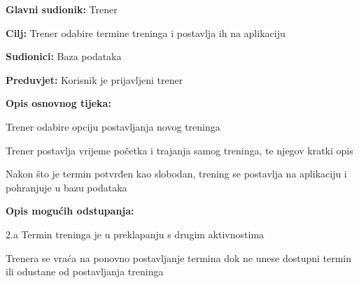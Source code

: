 \documentclass{article}
\begin{document}
		\begin{packed_item}
			
			\item \textbf{Glavni sudionik: }Trener
			\item  \textbf{Cilj:} Trener odabire termine treninga i postavlja ih na aplikaciju   
			\item  \textbf{Sudionici:} Baza podataka
			\item  \textbf{Preduvjet:} Korisnik je prijavljeni trener 
			\item  \textbf{Opis osnovnog tijeka:}
			
			\item[] \begin{packed_enum}
				\item Trener odabire opciju postavljanja novog treninga  
				\item Trener postavlja vrijeme početka i trajanja samog treninga, te njegov kratki opis 
				\item Nakon što je termin potvrđen kao slobodan, trening se postavlja na aplikaciju i pohranjuje u bazu podataka 
			\end{packed_enum}
			
			\item  \textbf{Opis mogućih odstupanja:}
			
			\item[] \begin{packed_item}
				
				\item[2.a] Termin treninga je u preklapanju s drugim aktivnostima
				\item[] \begin{packed_enum}
					\item Trenera se vraća na ponovno postavljanje termina dok ne unese dostupni termin ili odustane od postavljanja treninga 
				\end{packed_enum}
			\end{packed_item}
		\end{packed_item}
	
\end{document}
